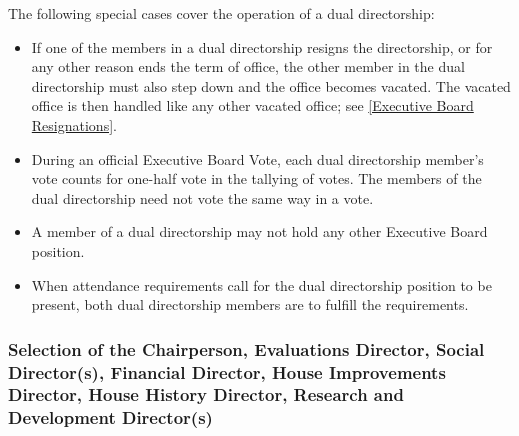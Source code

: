 \documentclass{article}
\newcommand{\asubsection}[1]{\subsubsection{#1} \label{#1}}
\begin{document}
The following special cases cover the operation of a dual directorship:
\begin{itemize}
	\item If one of the members in a dual directorship resigns the directorship, or for any other reason ends the term of office, the other member in the dual directorship must also step down and the office becomes vacated.
		The vacated office is then handled like any other vacated office; see \ref{Executive Board Resignations}.
	\item During an official Executive Board Vote, each dual directorship member's vote counts for one-half vote in the tallying of votes.
		The members of the dual directorship need not vote the same way in a vote.
	\item A member of a dual directorship may not hold any other Executive Board position.
	\item When attendance requirements call for the dual directorship position to be present, both dual directorship members are to fulfill the requirements.
\end{itemize}
\asubsection{Selection of the Chairperson, Evaluations Director, Social Director(s), Financial Director, House Improvements Director, House History Director, Research and Development Director(s)}
\end{document}
